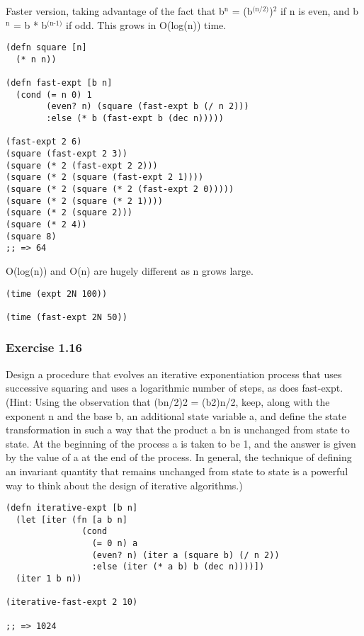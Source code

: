 \documentclass[11pt]{article}
\begin{document}
Faster version, taking advantage of the fact that b$^{\text{n}}$ = (b$^{\text{(n/2)}}$)$^{\text{2}}$ if n is even, and b$^{\text{n}}$ = b * b$^{\text{(n-1)}}$ if odd. This grows in O(log(n)) time. 

\begin{verbatim}
(defn square [n]
  (* n n))

(defn fast-expt [b n]
  (cond (= n 0) 1
        (even? n) (square (fast-expt b (/ n 2)))
        :else (* b (fast-expt b (dec n)))))

(fast-expt 2 6)
(square (fast-expt 2 3))
(square (* 2 (fast-expt 2 2)))
(square (* 2 (square (fast-expt 2 1))))
(square (* 2 (square (* 2 (fast-expt 2 0)))))
(square (* 2 (square (* 2 1))))
(square (* 2 (square 2)))
(square (* 2 4))
(square 8)
;; => 64
\end{verbatim}

O(log(n)) and O(n) are hugely different as n grows large.

\begin{verbatim}
(time (expt 2N 100))

(time (fast-expt 2N 50))
\end{verbatim}

\subsubsection{Exercise 1.16}
\label{sec-2-4-1}
Design a procedure that evolves an iterative exponentiation process that uses successive squaring and uses a logarithmic number of steps, as does fast-expt. (Hint: Using the observation that (bn/2)2 = (b2)n/2, keep, along with the exponent n and the base b, an additional state variable a, and define the state transformation in such a way that the product a bn is unchanged from state to state. At the beginning of the process a is taken to be 1, and the answer is given by the value of a at the end of the process. In general, the technique of defining an invariant quantity that remains unchanged from state to state is a powerful way to think about the design of iterative algorithms.)

\begin{verbatim}
(defn iterative-expt [b n]
  (let [iter (fn [a b n]
               (cond
                 (= 0 n) a
                 (even? n) (iter a (square b) (/ n 2))
                 :else (iter (* a b) b (dec n))))])
  (iter 1 b n))

(iterative-fast-expt 2 10)

;; => 1024
\end{verbatim}
\end{document}
